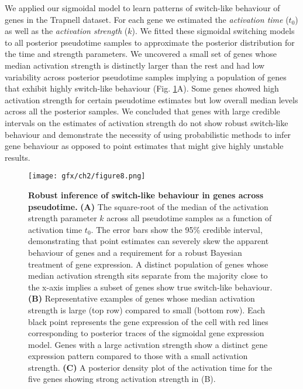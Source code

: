 We applied our sigmoidal model to learn patterns of switch-like behaviour of genes in the Trapnell dataset. For each gene we estimated the \emph{activation time} ($t_0$) as well as the \emph{activation strength} ($k$). We fitted these sigmoidal switching models to all posterior pseudotime samples to approximate the posterior distribution for the time and strength parameters. We uncovered a small set of genes whose median activation strength is distinctly larger than the rest and had low variability across posterior pseudotime samples implying a population of genes that exhibit highly switch-like behaviour (Fig. \ref{fig:switchres}A). Some genes showed high activation strength for certain pseudotime estimates but low overall median levels across all the posterior samples. We concluded that genes with large credible intervals on the estimates of activation strength do not show robust switch-like behaviour and demonstrate the necessity of using probabilistic methods to infer gene behaviour as opposed to point estimates that might give highly unstable results.

\begin{figure}
\centering
	\texttt{[image: gfx/ch2/figure8.png]}
\caption{ {\bf Robust inference of switch-like behaviour in genes across pseudotime.}
\textbf{(A)} The square-root of the median of the activation strength parameter $k$ across all pseudotime samples as a function of activation time $t_0$. The error bars show the 95\% credible interval, demonstrating that point estimates can severely skew the apparent behaviour of genes and a requirement for a robust Bayesian treatment of gene expression. A distinct population of genes whose median activation strength sits separate from the majority close to the x-axis implies a subset of genes show true switch-like behaviour. \textbf{(B)} Representative examples of genes whose median activation strength is large (top row) compared to small (bottom row). Each black point represents the gene expression of the cell with red lines corresponding to posterior traces of the sigmoidal gene expression model. Genes with a large activation strength show a distinct gene expression pattern compared to those with a small activation strength. \textbf{(C)} A posterior density plot of the activation time for the five genes showing strong activation strength in (B).} \label{fig:switchres}
\end{figure}

